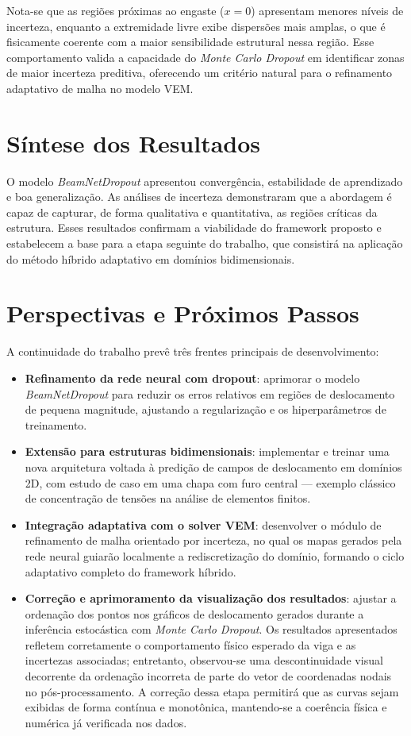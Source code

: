 \documentclass[12pt,openright,oneside,a4paper,english,brazil]{abntex2}
\begin{document}
Nota-se que as regiões próximas ao engaste (\(x=0\)) apresentam menores níveis de incerteza, enquanto a extremidade livre exibe dispersões mais amplas, o que é fisicamente coerente com a maior sensibilidade estrutural nessa região. Esse comportamento valida a capacidade do \textit{Monte Carlo Dropout} em identificar zonas de maior incerteza preditiva, oferecendo um critério 
natural para o refinamento adaptativo de malha no modelo VEM.

\section{Síntese dos Resultados}

O modelo \textit{BeamNetDropout} apresentou convergência, estabilidade de aprendizado e boa generalização. As análises de incerteza demonstraram que a abordagem é capaz de capturar, de forma qualitativa e quantitativa, as regiões críticas da estrutura. Esses resultados confirmam a viabilidade do framework proposto e estabelecem a base para a etapa seguinte do trabalho, que 
consistirá na aplicação do método híbrido adaptativo em domínios bidimensionais.

\section{Perspectivas e Próximos Passos}

A continuidade do trabalho prevê três frentes principais de desenvolvimento:

\begin{itemize}
    \item \textbf{Refinamento da rede neural com dropout}: aprimorar o modelo \textit{BeamNetDropout} para reduzir os erros relativos em regiões de deslocamento de pequena magnitude, ajustando a regularização e os hiperparâmetros de treinamento.
    \item \textbf{Extensão para estruturas bidimensionais}: implementar e treinar uma nova arquitetura voltada à predição de campos de deslocamento em domínios 2D, com estudo de caso em uma chapa com furo central — exemplo clássico de concentração de tensões na análise de elementos finitos.
    \item \textbf{Integração adaptativa com o solver VEM}: desenvolver o módulo de refinamento de malha orientado por incerteza, no qual os mapas gerados pela rede neural guiarão localmente a rediscretização do domínio, formando o ciclo adaptativo completo do framework híbrido.
    \item \textbf{Correção e aprimoramento da visualização dos resultados}: ajustar a ordenação dos pontos nos gráficos de deslocamento gerados durante a inferência estocástica com \textit{Monte Carlo Dropout}. Os resultados apresentados refletem corretamente o comportamento físico esperado da viga e as incertezas associadas; entretanto, observou-se uma descontinuidade visual decorrente da ordenação incorreta de parte do vetor de coordenadas nodais no pós-processamento. A correção dessa etapa permitirá que as curvas sejam exibidas de forma contínua e monotônica, mantendo-se a coerência física e numérica já verificada nos dados.
\end{itemize}
\end{document}
